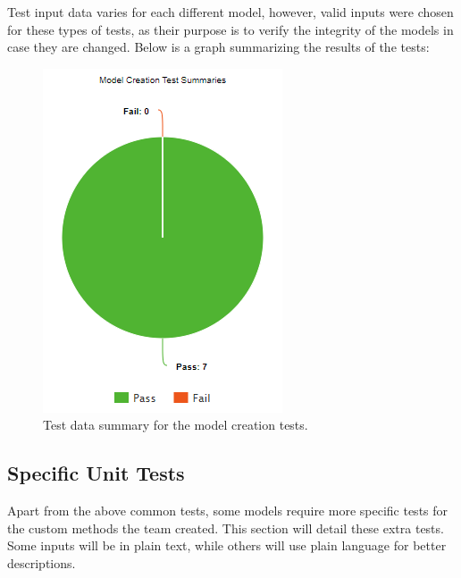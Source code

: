 \documentclass[12pt, titlepage]{article}
\begin{document}
Test input data varies for each different model, however, valid inputs were chosen for these types of tests, as their purpose is to verify the integrity of the models in case they are changed. Below is a graph summarizing the results of the tests:

\begin{figure}[H]
    \centering
    \includegraphics{./model_creation_pie_chart.png}
    \caption{Test data summary for the model creation tests.}
    \label{fig:creation_chart}
\end{figure}

\subsection{Specific Unit Tests}

Apart from the above common tests, some models require more specific tests for the custom methods the team created. This section will detail these extra tests. Some inputs will be in plain text, while others will use plain language for better descriptions.
\end{document}
